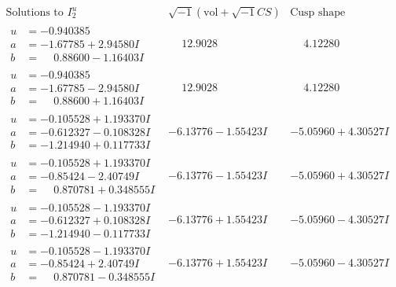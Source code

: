 \documentclass[1p]{elsarticle_modified}
\theoremstyle{definition}
\newcommand{\I}{\sqrt{-1}}
\begin{document}
$$\begin{array}{c|c|c}  
\text{Solutions to }I^u_{2}& \I (\text{vol} + \sqrt{-1}CS) & \text{Cusp shape}\\
 \hline 
\begin{aligned}
u &= -0.940385\phantom{ +0.000000I} \\
a &= -1.67785 + 2.94580 I \\
b &= \phantom{-}0.88600 - 1.16403 I\end{aligned}
 & \phantom{-}12.9028\phantom{ +0.000000I} & \phantom{-}4.12280\phantom{ +0.000000I} \\ \hline\begin{aligned}
u &= -0.940385\phantom{ +0.000000I} \\
a &= -1.67785 - 2.94580 I \\
b &= \phantom{-}0.88600 + 1.16403 I\end{aligned}
 & \phantom{-}12.9028\phantom{ +0.000000I} & \phantom{-}4.12280\phantom{ +0.000000I} \\ \hline\begin{aligned}
u &= -0.105528 + 1.193370 I \\
a &= -0.612327 - 0.108328 I \\
b &= -1.214940 + 0.117733 I\end{aligned}
 & -6.13776 - 1.55423 I & -5.05960 + 4.30527 I \\ \hline\begin{aligned}
u &= -0.105528 + 1.193370 I \\
a &= -0.85424 - 2.40749 I \\
b &= \phantom{-}0.870781 + 0.348555 I\end{aligned}
 & -6.13776 - 1.55423 I & -5.05960 + 4.30527 I \\ \hline\begin{aligned}
u &= -0.105528 - 1.193370 I \\
a &= -0.612327 + 0.108328 I \\
b &= -1.214940 - 0.117733 I\end{aligned}
 & -6.13776 + 1.55423 I & -5.05960 - 4.30527 I \\ \hline\begin{aligned}
u &= -0.105528 - 1.193370 I \\
a &= -0.85424 + 2.40749 I \\
b &= \phantom{-}0.870781 - 0.348555 I\end{aligned}
 & -6.13776 + 1.55423 I & -5.05960 - 4.30527 I \\ \hline\begin{aligned}

\end{aligned}
\end{array}$$
\end{document}
